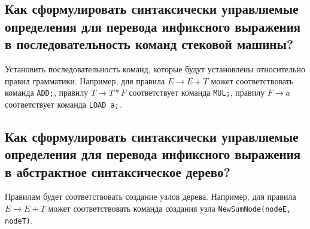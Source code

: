 \subsection{Как сформулировать синтаксически управляемые определения для перевода инфиксного выражения в последовательность команд стековой машины?}

Установить последовательность команд, которые будут установлены относительно правил грамматики.
	Например, для правила $E \rightarrow E + T$ может соответствовать команда \texttt{ADD;}, правилу 
	$T \rightarrow T * F$ соответствует команда \texttt{MUL;}, правилу $F \rightarrow a$ соответствует команда \texttt{LOAD a;}.

\subsection{Как сформулировать синтаксически управляемые определения для перевода инфиксного выражения в абстрактное синтаксическое дерево?}

Правилам будет соответствовать создание узлов дерева.
Например, для правила $E \rightarrow E + T$ 
может соответствовать команда создания узла \texttt{NewSumNode(nodeE, nodeT)}.
